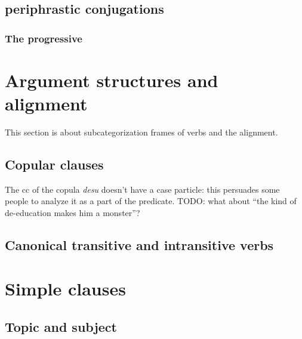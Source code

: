 \documentclass[UTF8, a4paper, oneside, scheme=plain]{ctexart}
\newcommand{\corpus}[1]{\emph{#1}}
\begin{document}
\subsection{periphrastic conjugations}

\subsubsection{The progressive}

\section{Argument structures and alignment}\label{sec:arguments}

This section is about subcategorization frames of verbs and the alignment.

\subsection{Copular clauses}

The \ac{cc} of the copula \corpus{desu} doesn't have a case particle:
this persuades some people to analyze it as a part of the predicate.
TODO: what about ``the kind of de-education makes him a monster''?

\subsection{Canonical transitive and intransitive verbs}

\section{Simple clauses}

\subsection{Topic and subject}\label{sec:topic-subject}
\end{document}
